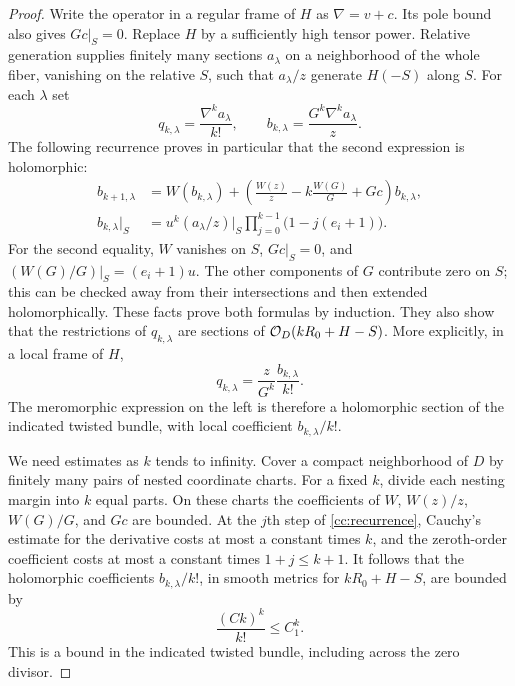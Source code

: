 \begin{proof}
Write the operator in a regular frame of $H$ as $\nabla=v+c$.  Its pole
bound also gives $Gc|_S=0$.  Replace $H$ by a sufficiently high tensor
power.  Relative generation supplies finitely many sections
$a_\lambda$ on a neighborhood of the whole fiber, vanishing on the
relative $S$, such that $a_\lambda/z$ generate $H(-S)$ along $S$.
For each $\lambda$ set
\[
 q_{k,\lambda}=\frac{\nabla^k a_\lambda}{k!},\qquad
 b_{k,\lambda}=\frac{G^k\nabla^ka_\lambda}{z}.
\]
The following recurrence proves in particular that the second
expression is holomorphic:
\begin{align}
 b_{k+1,\lambda}
  &=W(b_{k,\lambda})+
     \left(\frac{W(z)}z-k\frac{W(G)}G+Gc\right)b_{k,\lambda},
                                                       \label{cc:recurrence}\\
 b_{k,\lambda}|_S
  &=u^k(a_\lambda/z)|_S
           \prod_{j=0}^{k-1}\bigl(1-j(e_i+1)\bigr).
                                                       \label{cc:leading}
\end{align}
For the second equality, $W$ vanishes on $S$, $Gc|_S=0$, and
$(W(G)/G)|_S=(e_i+1)u$.  The other components of $G$ contribute zero
on $S$; this can be checked away from their intersections and then
extended holomorphically.  These facts prove both formulas by induction.
They also show that the restrictions of $q_{k,\lambda}$ are sections of
$\mathcal O_D(kR_0+H-S)$. More explicitly, in a local frame of $H$,
\[
 q_{k,\lambda}=\frac{z}{G^k}\frac{b_{k,\lambda}}{k!}.
\]
The meromorphic expression on the left is therefore a holomorphic
section of the indicated twisted bundle, with local coefficient
$b_{k,\lambda}/k!$.

We need estimates as $k$ tends to infinity.  Cover a compact
neighborhood of $D$ by finitely many pairs of nested coordinate charts.
For a fixed $k$, divide each nesting margin into $k$ equal parts.  On
these charts the coefficients of $W$, $W(z)/z$, $W(G)/G$, and $Gc$ are
bounded.  At the $j$th step of \eqref{cc:recurrence}, Cauchy's estimate
for the derivative costs at most a constant times $k$, and the
zeroth-order coefficient costs at most a constant times $1+j\le k+1$.
It follows that the holomorphic coefficients $b_{k,\lambda}/k!$, in
smooth metrics for $kR_0+H-S$, are bounded by
\begin{equation}
                   \frac{(Ck)^k}{k!}\le C_1^k.
\label{cc:cauchy}
\end{equation}
This is a bound in the indicated twisted bundle, including across the
zero divisor.


\end{proof}
